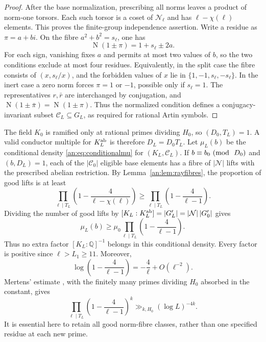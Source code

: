 \documentclass[11pt,reqno]{amsart}
\theoremstyle{definition}
\numberwithin{equation}{section}
\newcommand{\Q}{\mathbb Q}
\newcommand{\Nm}{\operatorname{N}}
\def\mo{{\rm{mod}\ }}
\def\pmod#1{\ (\mo\ #1)}
\begin{document}
\begin{proof}
After the base normalization, prescribing all norms leaves a product of norm-one torsors. Each such torsor is a coset of $\mathcal N_\ell$ and has $\ell-\chi(\ell)$ elements. This proves the finite-group independence assertion. Write a residue as $\pi=a+bi$. On the fibre $a^2+b^2=s_\ell$, one has
\[
 \Nm(1\pm\pi)=1+s_\ell\pm2a.
\]
For each sign, vanishing fixes $a$ and permits at most two values of $b$, so the two conditions exclude at most four residues. Equivalently, in the split case the fibre consists of $(x,s_\ell/x)$, and the forbidden values of $x$ lie in $\{1,-1,s_\ell,-s_\ell\}$. In the inert case a zero norm forces $\pi=1$ or $-1$, possible only if $s_\ell=1$. The representatives $r,\bar r$ are interchanged by conjugation, and $\Nm(1\pm\bar\pi)=\Nm(1\pm\pi)$. Thus the normalized condition defines a conjugacy-invariant subset $\mathcal C_L\subseteq G_L$, as required for rational Artin symbols.
\end{proof}

The field $K_0$ is ramified only at rational primes dividing $H_0$, so $(D_0,T_L)=1$. A valid conductor multiple for $K_L^{\rm ab}$ is therefore $D_L=D_0T_L$. Let $\mu_L(b)$ be the conditional density \eqref{an:eq:conditionalmu} for $(K_L,\mathcal C_L)$. If $b\equiv b_0\pmod{D_0}$ and $(b,D_L)=1$, each of the $|\mathcal C_0|$ eligible base elements has a fibre of $|\mathcal N|$ lifts with the prescribed abelian restriction. By Lemma~\ref{an:lem:rayfibres}, the proportion of good lifts is at least
\[
 \prod_{\ell\mid T_L}
 \left(1-\frac4{\ell-\chi(\ell)}\right)
 \ge \prod_{\ell\mid T_L}\left(1-\frac4{\ell-1}\right).
\]
Dividing the number of good lifts by $[K_L:K_L^{\rm ab}]=|G_L'|=|\mathcal N|\,|G_0'|$ gives
\begin{equation}\label{an:eq:muL}
 \mu_L(b)\ge
 \mu_0\prod_{\ell\mid T_L}\left(1-\frac4{\ell-1}\right).
\end{equation}
Thus no extra factor $[K_L:\Q]^{-1}$ belongs in this conditional density. Every factor is positive since $\ell>L_1\ge11$. Moreover,
\[
 \log\left(1-\frac4{\ell-1}\right)
 =-\frac4\ell+O(\ell^{-2}).
\]
Mertens' estimate \cite{Dav}, with the finitely many primes dividing $H_0$ absorbed in the constant, gives
\begin{equation}\label{an:eq:logcost}
 \prod_{\ell\mid T_L}\left(1-\frac4{\ell-1}\right)^k
 \gg_{k,H_0}(\log L)^{-4k}.
\end{equation}
It is essential here to retain all good norm-fibre classes, rather than one specified residue at each new prime.
\end{document}
